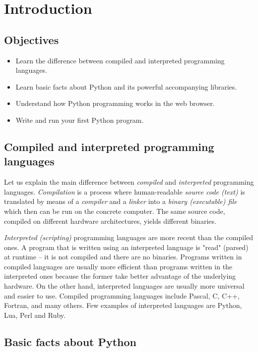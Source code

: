
\section{Introduction}

\subsection{Objectives}

\begin{itemize}
\item Learn the difference between compiled and interpreted programming languages.
\item Learn basic facts about Python and its powerful accompanying libraries.
\item Understand how Python programming works in the web browser.
\item Write and run your first Python program.
\end{itemize}

\subsection{Compiled and interpreted programming languages}

Let us explain the main difference between {\em compiled} and {\em interpreted} programming languages. 
{\em Compilation} is a process where human-readable {\em source code (text)} is translated by
means of a {\em compiler} and a {\em linker}
into a {\em binary (executable) file} which then can be run on the concrete computer. The same 
source code, compiled on different hardware architectures, yields different binaries. 

{\em Interpreted (scripting)} programming languages are more recent than the compiled ones. 
A program that is written using an interpreted language is "read" (parsed) at runtime -- it is 
not compiled and there are no binaries. Programs 
written in compiled languages are usually more efficient than programs written in the interpreted 
ones because the former take better advantage of the underlying hardware. On the other hand,
interpreted languages are usually more universal and easier to use. Compiled 
programming languages include Pascal, C, C++, Fortran, and many others. Few examples of interpreted 
languages are Python, Lua, Perl and Ruby. 

\subsection{Basic facts about Python}

